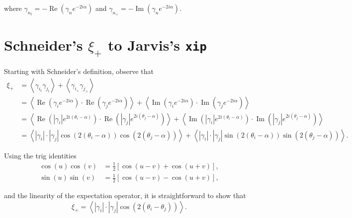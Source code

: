 \documentclass[%
 reprint,
 amsmath,amssymb,
 aps,nofootinbib
]{revtex4-1}
\begin{document}
where $\gamma_{n_t}=-\operatorname{Re}\left(\gamma_n e^{-2i\alpha}\right)$ and $\gamma_{n_\times}=-\operatorname{Im}\left(\gamma_n e^{-2i\alpha}\right)$.\\

\section*{Schneider's $\xi_+$ to Jarvis's \texttt{xip}}

Starting with Schneider's definition, observe that
\begin{align*}
\xi_+&=\left<\gamma_{i_t}\gamma_{j_t}\right>+\left<\gamma_{i_\times}\gamma_{j_\times}\right>\\
&=\left<\operatorname{Re}\left(\gamma_ie^{-2i\alpha}\right)\cdot\operatorname{Re}\left(\gamma_je^{-2i\alpha}\right)\right>+\left<\operatorname{Im}\left(\gamma_ie^{-2i\alpha}\right)\cdot\operatorname{Im}\left(\gamma_je^{-2i\alpha}\right)\right>\\
&=\left<\operatorname{Re}\left(|\gamma_i|e^{2i(\theta_i-\alpha)}\right)\cdot\operatorname{Re}\left(|\gamma_j|e^{2i(\theta_j-\alpha)}\right)\right>+\left<\operatorname{Im}\left(|\gamma_i|e^{2i(\theta_i-\alpha)}\right)\cdot\operatorname{Im}\left(|\gamma_j|e^{2i(\theta_j-\alpha)}\right)\right>\\
&=\left<|\gamma_i|\cdot|\gamma_j|\cos\left(2(\theta_i-\alpha)\right)\cos\left(2(\theta_j-\alpha)\right)\right>+\left<|\gamma_i|\cdot|\gamma_j|\sin\left(2(\theta_i-\alpha)\right)\sin\left(2(\theta_j-\alpha)\right)\right>.
\end{align*}

Using the trig identities
\begin{align}
\cos(u)\cos(v)&=\frac{1}{2}\left[\cos(u-v)+\cos(u+v)\right],\\
\sin(u)\sin(v)&=\frac{1}{2}\left[\cos(u-v)-\cos(u+v)\right],
\end{align}

and the linearity of the expectation operator, it is straightforward to show that
$$\xi_+=\left<|\gamma_i|\cdot|\gamma_j|\cos\left(2(\theta_i-\theta_j)\right)\right>.$$
\end{document}
